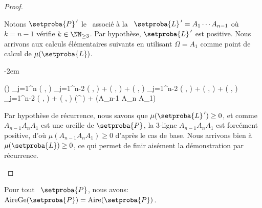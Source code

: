 \begin{proof}
\begin{itemize}
		
		\noindent
		Notons $\setproba{P}^{\,\prime}$ le \kgone\ associé à la \kline\ $\setproba{L}^{\,\prime} = A_1 \cdots A_{n-1}$ où $k = n-1$ vérifie $k \in \NN_{\geq3}$. Par hypothèse, $\setproba{L}^{\,\prime}$ est positive. Nous arrivons aux calculs élémentaires suivants en utilisant $\Omega = A_1$ comme point de calcul de $\mu(\setproba{L})$.

		\leavevmode\kern-2em%
		\begin{stepcalc}[style=ar*]
			\mu()
		\explnext{}
			\dsum_{j=1}^{n} \det \big(  ,   \big)
		\explnext{}
			\dsum_{j=1}^{n-2} \det \big(  ,   \big)
			+
			\det \big(  ,   \big)
			+
			\det \big(  ,   \big)
		          {}
			\dsum_{j=1}^{n-2} \det \big(  ,   \big)
			+
			\det \big(  ,   \big)
			+
			\det \big(  ,   \big)
		\explnext{}
			\dsum_{j=1}^{n-2} \det \big(  ,   \big)
			+
			\det \big(  ,   \big)
		          {}
			\mu(^{\,\prime})
			+
			\mu(A_{n-1} A_n A_1)
		\end{stepcalc}


		\noindent
		Par hypothèse de récurrence, nous savons que
		$\mu(\setproba{L}^{\,\prime}) \geq 0$, 
		et comme $A_{n-1} A_n A_1$ est une oreille de $\setproba{P}$, la $3$-ligne $A_{n-1} A_n A_1$ est forcément positive, d'où $\mu(A_{n-1} A_n A_1) \geq 0$ d'après le cas de base.
		Nous arrivons bien à $\mu(\setproba{L}) \geq 0$, ce qui permet de finir aisément la démonstration par récurrence.
	\end{itemize}
\end{proof}

    


\begin{fact} \label{ngone-garea-is-area}
    Pour tout \ngone\ $\setproba{P}$, nous avons: $\garea{\setproba{P}} = \area{\setproba{P}}$.
\end{fact}


